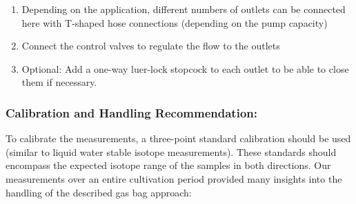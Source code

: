 \documentclass[
  11pt,
  letterpaper,
]{book}
\providecommand{\tightlist}{%
  \setlength{\itemsep}{0pt}\setlength{\parskip}{0pt}}
\begin{document}
\begin{enumerate}
\def\labelenumi{\alph{enumi}.}
\tightlist
\item
  Depending on the application, different numbers of outlets can be
  connected here with T-shaped hose connections (depending on the pump
  capacity)\\
\item
  Connect the control valves to regulate the flow to the outlets\\
\item
  Optional: Add a one-way luer-lock stopcock to each outlet to be able
  to close them if necessary.
\end{enumerate}

\subsubsection{Calibration and Handling
Recommendation:}\label{sec-isotope-bag-calibration}

To calibrate the measurements, a three-point standard calibration should
be used (similar to liquid water stable isotope measurements). These
standards should encompass the expected isotope range of the samples in
both directions. Our measurements over an entire cultivation period
provided many insights into the handling of the described gas bag
approach:
\end{document}
